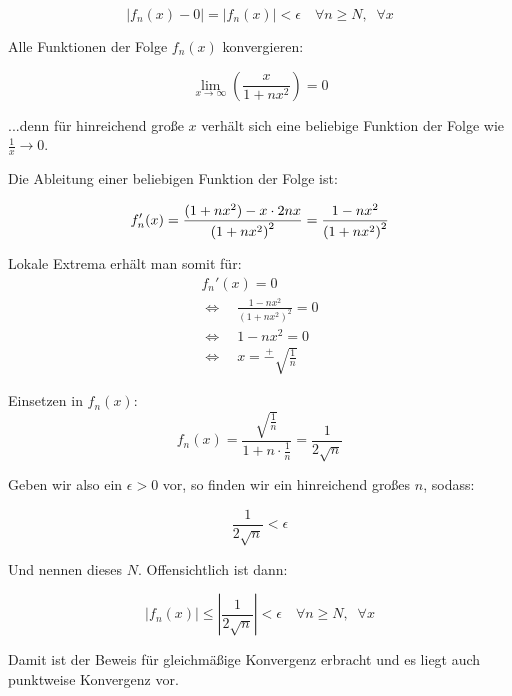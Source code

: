 \documentclass[a4paper,german,12pt,smallheadings]{scrartcl}
\begin{document}
\begin{equation*}
|f_n(x)-0|=|f_n(x)|<\epsilon \quad \forall n \geq N, \;\; \forall x
\end{equation*}

Alle Funktionen der Folge $f_n(x)$ konvergieren:

\begin{equation*}
\lim\limits_{x \to \infty} \left(\frac{x}{1+nx^2}\right)=0
\end{equation*}

...denn für hinreichend große $x$ verhält sich eine beliebige Funktion der Folge wie $\frac{1}{x} \rightarrow 0$.

Die Ableitung einer beliebigen Funktion der Folge ist:

\begin{equation*}
f_n'(x)=\frac{(1+nx^2)- x\cdot 2nx}{\left(1+nx^2\right)^2}=\frac{1-nx^2}{\left(1+nx^2\right)^2}\\
\end{equation*}

Lokale Extrema erhält man somit für:
\begin{align*}
f_n'(x)=0\\
\Leftrightarrow \quad \frac{1-nx^2}{\left(1+nx^2\right)^2}=0\\
\Leftrightarrow \quad 1-nx^2=0\\
\Leftrightarrow \quad x=\overset{+}{-}\sqrt{\frac{1}{n}}
\end{align*}

Einsetzen in $f_n(x)$:
\begin{equation*}
f_n(x)=\frac{\sqrt{\frac{1}{n}}}{1+n\cdot\frac{1}{n}}=\frac{1}{2\sqrt{n}}
\end{equation*}

Geben wir also ein $\epsilon>0$ vor, so finden wir ein hinreichend großes $n$, sodass:

\begin{equation*}
\frac{1}{2\sqrt{n}} < \epsilon
\end{equation*}

Und nennen dieses $N$. Offensichtlich ist dann:

\begin{equation*}
|f_n(x)|\leq\left|\frac{1}{2\sqrt{n}}\right| < \epsilon \quad \forall n\geq N, \;\;\forall x
\end{equation*}

Damit ist der Beweis für gleichmäßige Konvergenz erbracht und es liegt auch punktweise Konvergenz vor.\\
\\
\end{document}
